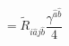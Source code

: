 \begin{equation}
[\tilde D_i,\tilde D_j]=\tilde R_{i\hat aj \hat
b}\frac{\gamma^{\hat a\hat b}}{4}
\end{equation}

